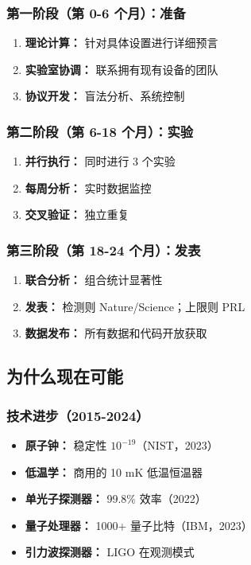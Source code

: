 \documentclass[11pt,a4paper]{article}
\begin{document}
	\subsubsection{第一阶段（第 0-6 个月）：准备}
	
	\begin{enumerate}
		\item \textbf{理论计算：} 针对具体设置进行详细预言
		\item \textbf{实验室协调：} 联系拥有现有设备的团队
		\item \textbf{协议开发：} 盲法分析、系统控制
	\end{enumerate}
	
	\subsubsection{第二阶段（第 6-18 个月）：实验}
	
	\begin{enumerate}
		\item \textbf{并行执行：} 同时进行 3 个实验
		\item \textbf{每周分析：} 实时数据监控
		\item \textbf{交叉验证：} 独立重复
	\end{enumerate}
	
	\subsubsection{第三阶段（第 18-24 个月）：发表}
	
	\begin{enumerate}
		\item \textbf{联合分析：} 组合统计显著性
		\item \textbf{发表：} 检测则 Nature/Science；上限则 PRL
		\item \textbf{数据发布：} 所有数据和代码开放获取
	\end{enumerate}
	
	\subsection{为什么现在可能}
	
	\subsubsection{技术进步（2015-2024）}
	
	\begin{itemize}
		\item \textbf{原子钟：} 稳定性 $10^{-19}$（NIST，2023）
		\item \textbf{低温学：} 商用的 10 mK 低温恒温器
		\item \textbf{单光子探测器：} 99.8\% 效率（2022）
		\item \textbf{量子处理器：} 1000+ 量子比特（IBM，2023）
		\item \textbf{引力波探测器：} LIGO 在观测模式
	\end{itemize}
	
\end{document}
